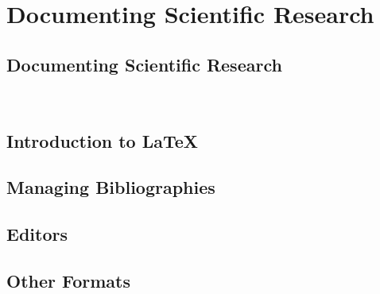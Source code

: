 \part{Documenting Scientific Research}
\label{p:writing}


\chapter{Documenting Scientific Research}
\label{C:doc}

\FILENAME\







% 

\chapter{Introduction to \LaTeX}
\label{C:latex}



\chapter{Managing Bibliographies}
\label{C:bibtex}



\chapter{Editors}


\chapter{Other Formats}





%

